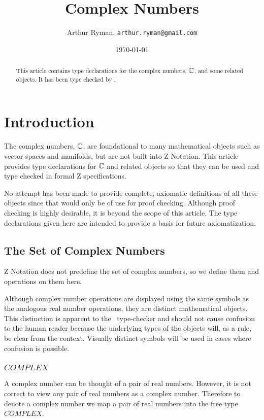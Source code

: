 \documentclass[11pt, oneside]{article}
\title{Complex Numbers}
\author{Arthur Ryman, {\texttt{arthur.ryman@gmail.com} }}
\date{\today}
\begin{document}
\maketitle

\begin{abstract}
This article contains \ZN type declarations for the complex numbers, $\mathbb{C}$, and some related objects.
It has been type checked by \fuzz.
\end{abstract}

\tableofcontents

\section{Introduction}

The complex numbers, $\mathbb{C}$, are foundational to many mathematical objects such as vector spaces and manifolds,
but are not built into Z Notation.
This article provides type declarations for $\mathbb{C}$ and related objects so that they can be used and type checked in formal Z specifications.

No attempt has been made to provide complete, axiomatic definitions of all these objects since that would only be of use for proof checking.
Although proof checking is highly desirable, it is beyond the scope of this article.
The type declarations given here are intended to provide a basis for future axiomatization.

\subsection{The Set of Complex Numbers}

Z Notation does not predefine the set of complex numbers, so we define
them and operations on them here.

Although complex number operations are displayed using the same symbols as the 
analogous real number operations,
they are distinct mathematical objects.
This distinction is apparent to the \fuzz\ type-checker and should not cause confusion to the human reader
because the underlying types of the objects will, as a rule, be clear from the context.
Visually distinct symbols will be used in cases where confusion is possible.

\subsubsection{$COMPLEX$}

A complex number can be thought of a pair of real numbers.
However, it is not correct to view any pair of real numbers as a complex number.
Therefore to denote a complex number we map a pair of real numbers
into the free type $COMPLEX$.
\end{document}
